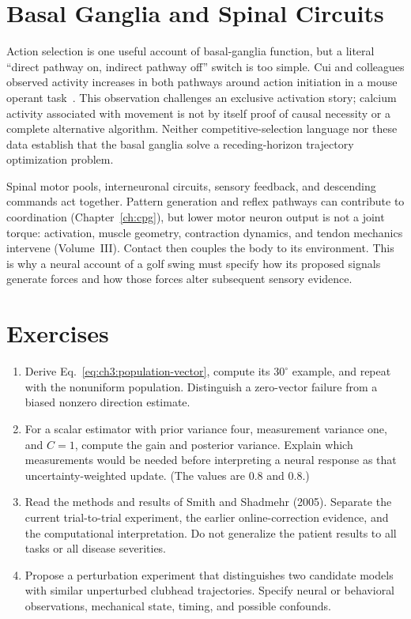 \section{Basal Ganglia and Spinal Circuits}

Action selection is one useful account of basal-ganglia function, but a literal
``direct pathway on, indirect pathway off'' switch is too simple. Cui and
colleagues observed activity increases in both pathways around action initiation
in a mouse operant task~\cite{Cui2013Review}. This observation challenges an
exclusive activation story; calcium activity associated with movement is not
by itself proof of causal necessity or a complete alternative algorithm.
Neither competitive-selection language nor these data establish that the basal
ganglia solve a receding-horizon trajectory optimization problem.

Spinal motor pools, interneuronal circuits, sensory feedback, and descending
commands act together. Pattern generation and reflex pathways can contribute
to coordination (Chapter~\ref{ch:cpg}), but lower motor neuron output is not a joint
torque: activation, muscle geometry, contraction dynamics, and tendon mechanics
intervene (Volume~III). Contact then couples the body to its environment.
This is why a neural account of a golf swing must specify how its proposed
signals generate forces and how those forces alter subsequent sensory evidence.

\section*{Exercises}
\begin{enumerate}
 \item Derive Eq.~\eqref{eq:ch3:population-vector}, compute its $30^\circ$
 example, and repeat with the nonuniform population. Distinguish a zero-vector
 failure from a biased nonzero direction estimate.
 \item For a scalar estimator with prior variance four, measurement variance
 one, and $C=1$, compute the gain and posterior variance. Explain which
 measurements would be needed before interpreting a neural response as that
 uncertainty-weighted update. (The values are $0.8$ and $0.8$.)
 \item Read the methods and results of Smith and Shadmehr (2005). Separate the
 current trial-to-trial experiment, the earlier online-correction evidence,
 and the computational interpretation. Do not generalize the patient results
 to all tasks or all disease severities.
 \item Propose a perturbation experiment that distinguishes two candidate
 models with similar unperturbed clubhead trajectories. Specify neural or
 behavioral observations, mechanical state, timing, and possible confounds.
\end{enumerate}
